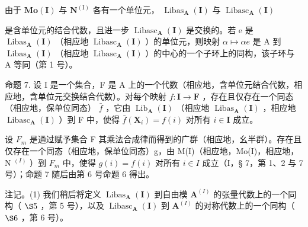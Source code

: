 由于 \(\mathbf{Mo}(\mathbf{I})\) 与 \(\mathbf{N}^{(\mathrm{I})}\) 各有一个单位元， \(\operatorname{Libas}_{\mathbf{A}}(\mathbf{I})\) 与 \(\operatorname{Libasc}_{\mathbf{A}}(\mathbf{I})\)

是含单位元的结合代数，且进一步 \(\operatorname{Libasc}_{\mathbf{A}}(\mathbf{I})\) 是交换的。若 e 是 \(\operatorname{Libas}_{\mathbf{A}}(\mathbf{I})\) （相应地 \(\operatorname{Libasc}_{\mathbf{A}}(\mathbf{I})\) ）的单位元，则映射 \(\alpha \mapsto \alpha e\) 是 A 到 \(\operatorname{Libas}_{\mathbf{A}}(\mathbf{I})\) （相应地 \(\operatorname{Libasc}_{\mathbf{A}}(\mathbf{I})\) ）的中心的一个子环上的同构，该子环与 A 等同（第 1 号）。

命题 7. 设 I 是一个集合，F 是 A 上的一个代数（相应地，含单位元结合代数，相应地，含单位元交换结合代数）。对每个映射 \(f:\mathbf{I}\to\mathbf{F}\) ，存在且仅存在一个同态（相应地，保单位同态） \(\bar{f}\) ，它由 \(\operatorname{Lib}_{\mathbf{A}}(\mathbf{I})\) （相应地 \(\operatorname{Libas}_{\mathbf{A}}(\mathbf{I})\) ，相应地 \(\operatorname{Libasc}_{\mathbf{A}}(\mathbf{I})\) ）到 F 中，使得 \(\bar{f}(\mathbf{X}_{i})=f(i)\) 对所有 \(i\in\mathbf{I}\) 成立。

设 \(F_{m}\) 是通过赋予集合 F 其乘法合成律而得到的广群（相应地，幺半群）。存在且仅存在一个同态（相应地，保单位同态）g，由 M(I)（相应地，Mo(I)，相应地，N \(^{(I)}\) ）到 \(F_{m}\) 中，使得 \(g(i) = f(i)\) 对所有 \(i \in I\) 成立（I，§ 7，第 1、2 与 7 号）；命题 7 随后由第 6 号命题 6 得出。

注记。(1) 我们稍后将定义 \(\operatorname{Libas}_{\mathbf{A}}(\mathbf{I})\) 到自由模 \(\mathbf{A}^{(I)}\) 的张量代数上的一个同构（ \(\S 5\) ，第 5 号），以及 \(\operatorname{Libasc}_{\mathbf{A}}(\mathbf{I})\) 到 \(\mathbf{A}^{(I)}\) 的对称代数上的一个同构（ \(\S 6\) ，第 6 号）。

